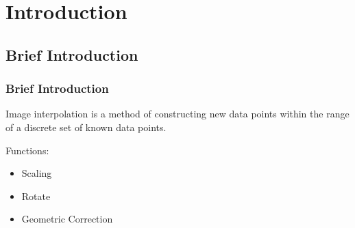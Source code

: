 \documentclass[notheorems,serif,table,compress]{beamer}  %
\begin{document}



\def\hilite<#1>{\temporal<#1>{\color{blue!15}}{\color{black}}{\color{black}}}
\newcommand{\shadow}[2][purple]{\hskip5pt\shadowbox{\color{#1}\small \kai #2\vspace{3mm}}}
\newcommand{\colorrbox}[2][purple]{\doublebox{\color{#1}\small \kai#2}}


\section{Introduction}

\subsection{Brief Introduction}
\begin{frame}[fragile]
\frametitle{Brief Introduction}
    Image interpolation is a method of constructing new data points within the range of a discrete set of known data points.

    Functions:	
	\begin{itemize}
	\item Scaling
	\item Rotate
	\item Geometric Correction
    	\end{itemize}
\end{frame}
\end{document}
